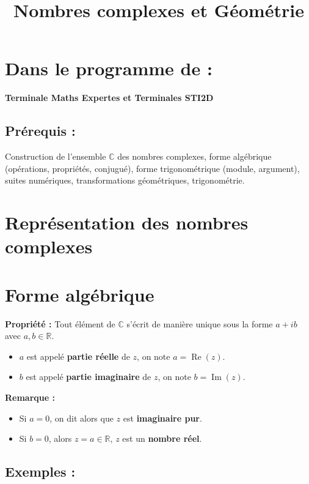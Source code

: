 \documentclass[a4paper,12pt]{article}
\title{Nombres complexes et Géométrie}
\begin{document}
    \maketitle

    \section*{Dans le programme de :}
    \textbf{Terminale Maths Expertes et Terminales STI2D}

    \subsection*{Prérequis :}
    Construction de l’ensemble $\mathbb{C}$ des nombres complexes, forme algébrique (opérations, propriétés, conjugué), forme trigonométrique (module, argument), suites numériques, transformations géométriques, trigonométrie.

    \section*{Représentation des nombres complexes}
    \section{Forme algébrique}
    \textbf{Propriété :} Tout élément de $\mathbb{C}$ s’écrit de manière unique sous la forme $a + ib$ avec $a, b \in \mathbb{R}$.

    \begin{itemize}
        \item $a$ est appelé \textbf{partie réelle} de $z$, on note $a = \operatorname{Re}(z)$.
        \item $b$ est appelé \textbf{partie imaginaire} de $z$, on note $b = \operatorname{Im}(z)$.
    \end{itemize}

    \textbf{Remarque :}
    \begin{itemize}
        \item Si $a = 0$, on dit alors que $z$ est \textbf{imaginaire pur}.
        \item Si $b = 0$, alors $z = a \in \mathbb{R}$, $z$ est un \textbf{nombre réel}.
    \end{itemize}

    \subsection{Exemples :}
\end{document}
